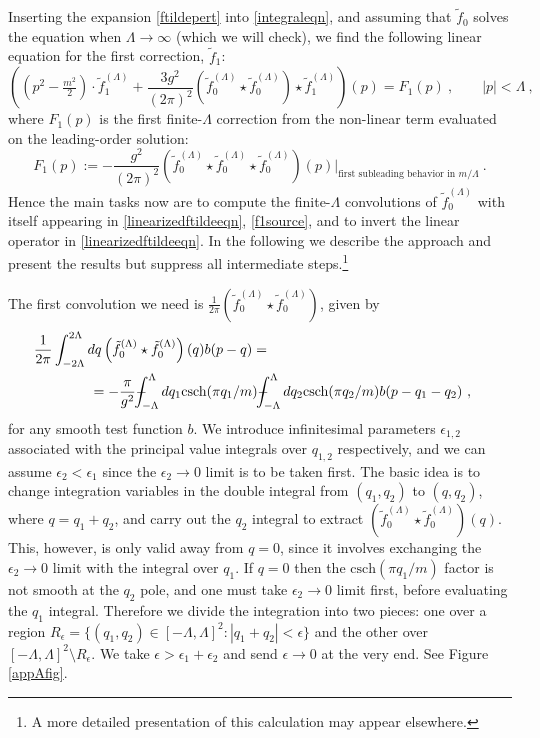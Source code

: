\def\letter{0}\def\pr{0}\documentclass[a4paper,12pt, epsfig]{article}
\def\Xint#1{\mathchoice
   {\XXint\displaystyle\textstyle{#1}}%
   {\XXint\textstyle\scriptstyle{#1}}%
   {\XXint\scriptstyle\scriptscriptstyle{#1}}%
   {\XXint\scriptscriptstyle\scriptscriptstyle{#1}}%
   \!\int}
\def\XXint#1#2#3{{\setbox0=\hbox{$#1{#2#3}{\int}$}
     \vcenter{\hbox{$#2#3$}}\kern-.5\wd0}}
\def\dashint{\Xint-}
\newcommand{\csch}{\textrm{csch}}
\renewcommand{\(}{\begin{equation}}
\renewcommand{\)}{end{equation} \vspace{-.05in}\linebreak}
\renewcommand{\=}{\hspace{-.03in}=\hspace{-.02in}}
\renewcommand{\(}{\begin{equation}}
\renewcommand{\)}{\end{equation}}
\renewcommand{\(}{\begin{equation}}
\renewcommand{\)}{\end{equation}}
\begin{document}
Inserting the expansion \eqref{ftildepert} into \eqref{integraleqn}, and assuming that $\tilde{f}_0$ solves the equation when $\Lambda \to \infty$ (which we will check), we find the following linear equation for the first correction, $\tilde{f}_1$:
%
\begin{equation}\label{linearizedftildeeqn}
\left( \left( p^2 - \tfrac{m^2}{2} \right) \cdot \tilde{f}_{1}^{(\Lambda)} + \frac{3 g^2}{(2\pi)^2} \left(\tilde{f}_{0}^{(\Lambda)} \star \tilde{f}_{0}^{(\Lambda)}\right) \star \tilde{f}_{1}^{(\Lambda)} \right)(p) = F_1(p)~, \qquad |p| < \Lambda~,
\end{equation}
%
where $F_1(p)$ is the first finite-$\Lambda$ correction from the non-linear term evaluated on the leading-order solution:
%
\begin{equation}\label{f1source}
F_1(p) := - \frac{g^2}{(2\pi)^2} \left(\tilde{f}_{0}^{(\Lambda)} \star \tilde{f}_{0}^{(\Lambda)} \star \tilde{f}_{0}^{(\Lambda)}\right)(p) \bigg|_{\textrm{first subleading behavior in $m/\Lambda$}} ~.
\end{equation}
%
Hence the main tasks now are to compute the finite-$\Lambda$ convolutions of $\tilde{f}_{0}^{(\Lambda)}$ with itself appearing in \eqref{linearizedftildeeqn}, \eqref{f1source}, and to invert the linear operator in \eqref{linearizedftildeeqn}.  In the following we describe the approach and present the results but suppress all intermediate steps.\footnote{A more detailed presentation of this calculation may appear elsewhere.}  

The first convolution we need is $\frac{1}{2\pi} (\tilde{f}_{0}^{(\Lambda)} \star \tilde{f}_{0}^{(\Lambda)})$, given by
%
\begin{align}\label{f0starf0}
& \frac{1}{2\pi} \int_{-2\Lambda}^{2\Lambda} dq \left(\tilde{f}_{0}^{(\Lambda)} \star \tilde{f}_{0}^{(\Lambda)}\right)(q) b(p - q) = \cr
& \qquad \qquad =  -\frac{\pi}{g^2} \dashint_{-\Lambda}^{\Lambda} dq_1 \csch(\pi q_1/m) \dashint_{-\Lambda}^{\Lambda} dq_2 \csch(\pi q_2/m) b(p - q_1 - q_2)~,
\end{align}
%
for any smooth test function $b$.  We introduce infinitesimal parameters $\epsilon_{1,2}$ associated with the principal value integrals over $q_{1,2}$ respectively, and we can assume $\epsilon_2 < \epsilon_1$ since the $\epsilon_2 \to 0$ limit is to be taken first.  The basic idea is to change integration variables in the double integral from $(q_1,q_2)$ to $(q,q_2)$, where $q = q_1 + q_2$, and carry out the $q_2$ integral to extract $(\tilde{f}_{0}^{(\Lambda)} \star \tilde{f}_{0}^{(\Lambda)})(q)$.  This, however, is only valid away from $q = 0$, since it involves exchanging the $\epsilon_2 \to 0$ limit with the integral over $q_1$.  If $q = 0$ then the $\csch(\pi q_1/m)$ factor is not smooth at the $q_2$ pole, and one must take $\epsilon_2 \to 0$ limit first, before evaluating the $q_1$ integral.  Therefore we divide the integration into two pieces: one over a region $R_\epsilon = \{ (q_1,q_2) \in [-\Lambda,\Lambda]^2 : |q_1 + q_2| < \epsilon \}$ and the other over $[-\Lambda, \Lambda]^2 \setminus R_\epsilon$.  We take $\epsilon > \epsilon_1 + \epsilon_2$ and send $\epsilon \to 0$ at the very end.  See Figure \ref{appAfig}.
\end{document}
